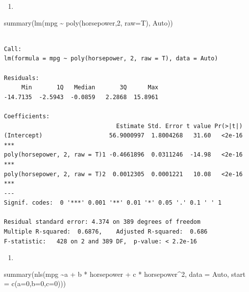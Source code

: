 \documentclass[
  letterpaper,
  DIV=11,
  numbers=noendperiod]{scrreprt}
\newenvironment{Shaded}{\begin{snugshade}}{\end{snugshade}}
\newcommand{\AttributeTok}[1]{\textcolor[rgb]{0.65,0.35,0.00}{#1}}
\newcommand{\DecValTok}[1]{\textcolor[rgb]{0.47,0.16,0.63}{#1}}
\newcommand{\FunctionTok}[1]{\textcolor[rgb]{0.02,0.16,0.49}{#1}}
\newcommand{\NormalTok}[1]{\textcolor[rgb]{0.33,0.33,0.33}{#1}}
\newcommand{\SpecialCharTok}[1]{\textcolor[rgb]{0.00,0.46,0.62}{#1}}
\providecommand{\tightlist}{%
  \setlength{\itemsep}{0pt}\setlength{\parskip}{0pt}}\usepackage{longtable,booktabs,array}
\begin{document}
\begin{enumerate}
\def\labelenumi{\arabic{enumi}.}
\setcounter{enumi}{2}
\tightlist
\item
\end{enumerate}

\begin{Shaded}
\begin{Highlighting}[]
\FunctionTok{summary}\NormalTok{(}\FunctionTok{lm}\NormalTok{(mpg }\SpecialCharTok{\textasciitilde{}} \FunctionTok{poly}\NormalTok{(horsepower,}\DecValTok{2}\NormalTok{, }\AttributeTok{raw=}\NormalTok{T), Auto))}
\end{Highlighting}
\end{Shaded}

\begin{verbatim}

Call:
lm(formula = mpg ~ poly(horsepower, 2, raw = T), data = Auto)

Residuals:
     Min       1Q   Median       3Q      Max 
-14.7135  -2.5943  -0.0859   2.2868  15.8961 

Coefficients:
                                Estimate Std. Error t value Pr(>|t|)    
(Intercept)                   56.9000997  1.8004268   31.60   <2e-16 ***
poly(horsepower, 2, raw = T)1 -0.4661896  0.0311246  -14.98   <2e-16 ***
poly(horsepower, 2, raw = T)2  0.0012305  0.0001221   10.08   <2e-16 ***
---
Signif. codes:  0 '***' 0.001 '**' 0.01 '*' 0.05 '.' 0.1 ' ' 1

Residual standard error: 4.374 on 389 degrees of freedom
Multiple R-squared:  0.6876,    Adjusted R-squared:  0.686 
F-statistic:   428 on 2 and 389 DF,  p-value: < 2.2e-16
\end{verbatim}

\begin{enumerate}
\def\labelenumi{\arabic{enumi}.}
\setcounter{enumi}{3}
\tightlist
\item
\end{enumerate}

\begin{Shaded}
\begin{Highlighting}[]
\FunctionTok{summary}\NormalTok{(}\FunctionTok{nls}\NormalTok{(mpg }\SpecialCharTok{\textasciitilde{}}\NormalTok{a }\SpecialCharTok{+}\NormalTok{ b }\SpecialCharTok{*}\NormalTok{ horsepower }\SpecialCharTok{+}\NormalTok{ c }\SpecialCharTok{*}\NormalTok{ horsepower}\SpecialCharTok{\^{}}\DecValTok{2}\NormalTok{, }\AttributeTok{data =}\NormalTok{ Auto, }\AttributeTok{start =} \FunctionTok{c}\NormalTok{(}\AttributeTok{a=}\DecValTok{0}\NormalTok{,}\AttributeTok{b=}\DecValTok{0}\NormalTok{,}\AttributeTok{c=}\DecValTok{0}\NormalTok{)))}
\end{Highlighting}
\end{Shaded}
\end{document}
